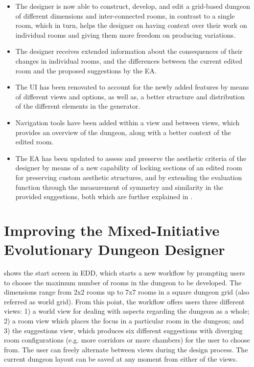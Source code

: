 \documentclass[sigconf]{acmart}
\begin{document}
\begin{itemize}
  \item The designer is now able to construct, develop, and edit a grid-based dungeon of different dimensions and inter-connected rooms, in contrast to a single room, which in turn, helps the designer on having context over their work on individual rooms and giving them more freedom on producing variations.
  \item The designer receives extended information about the consequences of their changes in individual rooms, and the differences between the current edited room and the proposed suggestions by the EA.
  \item The UI has been renovated to account for the newly added features by means of different views and options, as well as, a better structure and distribution of the different elements in the generator.
  \item Navigation tools have been added within a view and between views, which provides an overview of the dungeon, along with a better context of the edited room.
  \item The EA has been updated to assess and preserve the aesthetic criteria of the designer by means of a new capability of locking sections of an edited room for preserving custom aesthetic structures, and by extending the evaluation function through the measurement of symmetry and similarity in the provided suggestions, both which are further explained in \cite{Eddy2_5}.
\end{itemize}

\section{Improving the Mixed-Initiative Evolutionary Dungeon Designer} \label{approach}

 shows the start screen in EDD, which starts a new workflow by prompting users to choose the maximum number of rooms in the dungeon to be developed. The dimensions range from 2x2 rooms up to 7x7 rooms in a square dungeon grid (also referred as world grid). From this point, the workflow offers users three different views: 1) a world view for dealing with aspects regarding the dungeon as a whole; 2) a room view which places the focus in a particular room in the dungeon; and 3) the suggestions view, which produces six different suggestions with diverging room configurations (e.g. more corridors or more chambers) for the user to choose from. The user can freely alternate between views during the design process. The current dungeon layout can be saved at any moment from either of the views.
\end{document}
